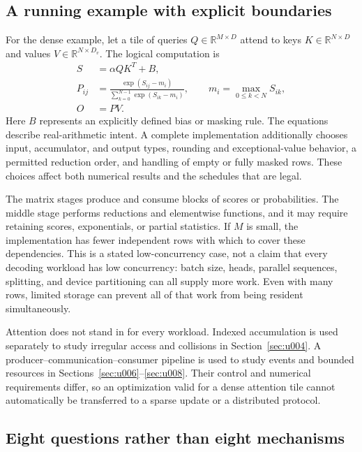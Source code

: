\subsection{A running example with explicit boundaries}

For the dense example, let a tile of queries $Q\in\mathbb{R}^{M\times D}$ attend to keys $K\in\mathbb{R}^{N\times D}$ and values $V\in\mathbb{R}^{N\times D_v}$. The logical computation is
\begin{align}
 S &= \alpha QK^T + B, \\
 P_{ij} &= \frac{\exp(S_{ij}-m_i)}{\sum_{k=0}^{N-1}\exp(S_{ik}-m_i)},\qquad
 m_i=\max_{0\leq k<N}S_{ik},\\
 O &= PV.
\end{align}
Here $B$ represents an explicitly defined bias or masking rule. The equations describe real-arithmetic intent. A complete implementation additionally chooses input, accumulator, and output types, rounding and exceptional-value behavior, a permitted reduction order, and handling of empty or fully masked rows. These choices affect both numerical results and the schedules that are legal.

The matrix stages produce and consume blocks of scores or probabilities. The middle stage performs reductions and elementwise functions, and it may require retaining scores, exponentials, or partial statistics. If $M$ is small, the implementation has fewer independent rows with which to cover these dependencies. This is a stated low-concurrency case, not a claim that every decoding workload has low concurrency: batch size, heads, parallel sequences, splitting, and device partitioning can all supply more work. Even with many rows, limited storage can prevent all of that work from being resident simultaneously.

Attention does not stand in for every workload. Indexed accumulation is used separately to study irregular access and collisions in Section~\ref{sec:u004}. A producer--communication--consumer pipeline is used to study events and bounded resources in Sections~\ref{sec:u006}--\ref{sec:u008}. Their control and numerical requirements differ, so an optimization valid for a dense attention tile cannot automatically be transferred to a sparse update or a distributed protocol.

\subsection{Eight questions rather than eight mechanisms}

